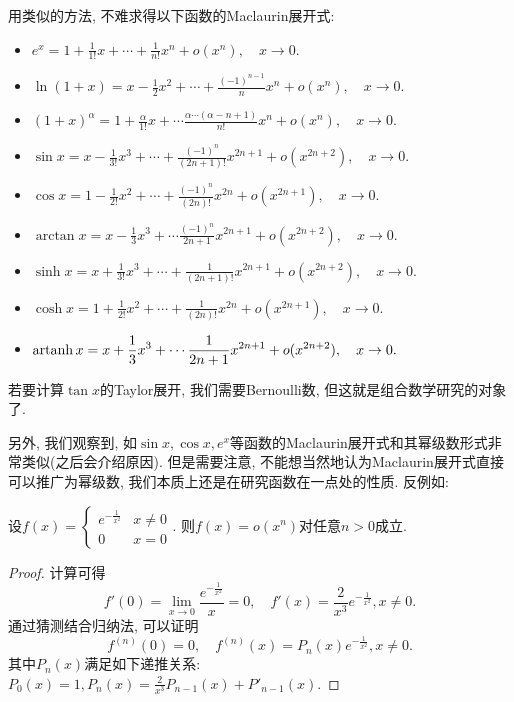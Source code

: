 用类似的方法, 不难求得以下函数的Maclaurin展开式: 
\begin{itemize}
	\item $\displaystyle e^x = 1 + \frac{1}{1!}x + \cdots + \frac{1}{n!} x^n + o(x^{n}),\quad x\to 0.$
	\item $\displaystyle \ln (1+x) = x - \frac{1}{2}x^2 + \cdots + \frac{(-1)^{n-1}}{n} x^n + o(x^{n}),\quad x \to 0. $
	\item $\displaystyle (1+x)^{\alpha} = 1 + \frac{\alpha}{1!}x + \cdots \frac{\alpha \cdots (\alpha -n+1)}{n!} x^n + o(x^{n}),\quad x \to 0.$
	\item $\displaystyle \sin x = x-\frac{1}{3!} x^3 + \cdots + \frac{(-1)^n}{(2n+1)!}x^{2n+1} + o(x^{2n+2}),\quad x\to 0.$
	\item $\displaystyle \cos x = 1-\frac{1}{2!} x^2 + \cdots + \frac{(-1)^n}{(2n)!}x^{2n} + o(x^{2n+1}),\quad x\to 0.$
	\item $\displaystyle \arctan x = x-\frac{1}{3}x^3+\cdots \frac{(-1)^n}{2n+1}x^{2n+1} + o(x^{2n+2}),\quad x\to 0.$
	\item $\displaystyle \sinh x = x+\frac{1}{3!} x^3 + \cdots + \frac{1}{(2n+1)!}x^{2n+1} + o(x^{2n+2}),\quad x\to 0.$
	\item $\displaystyle \cosh x = 1+\frac{1}{2!} x^2 + \cdots + \frac{1}{(2n)!}x^{2n} + o(x^{2n+1}),\quad x\to 0.$
	\item $\displaystyle \operatorname{artanh} x = x+\frac{1}{3}x^3+\cdots \frac{1}{2n+1}x^{2n+1} + o(x^{2n+2}),\quad x\to 0. $
\end{itemize}

若要计算$\tan x$的Taylor展开, 我们需要Bernoulli数, 但这就是组合数学研究的对象了. 

另外, 我们观察到, 如$\sin x,\cos x,e^x$等函数的Maclaurin展开式和其幂级数形式非常类似(之后会介绍原因). 但是需要注意, 不能想当然地认为Maclaurin展开式直接可以推广为幂级数, 我们本质上还是在研究函数在一点处的性质. 反例如: 

\begin{example}
	设$f(x)=\begin{cases}
		e^{-\frac{1}{x^2}} & x \neq 0 \\ 0 & x = 0
	\end{cases}$. 则$f(x)=o(x^n)$对任意$n>0$成立. 
\end{example}
\begin{proof}
	计算可得$$f'(0)=\lim_{x \to 0} \frac{e^{-\frac{1}{x^2}}}{x} = 0,\quad f'(x)=\frac{2}{x^3}e^{-\frac{1}{x^2}},x \neq 0.$$
	通过猜测结合归纳法, 可以证明$$f^{(n)}(0) = 0,\quad f^{(n)}(x) = P_n(x)e^{-\frac{1}{x^2}},x \neq 0.$$
	其中$P_n(x)$满足如下递推关系: $P_0(x)=1,P_n(x)=\frac{2}{x^3}P_{n-1}(x)+P'_{n-1}(x)$. 
\end{proof}

